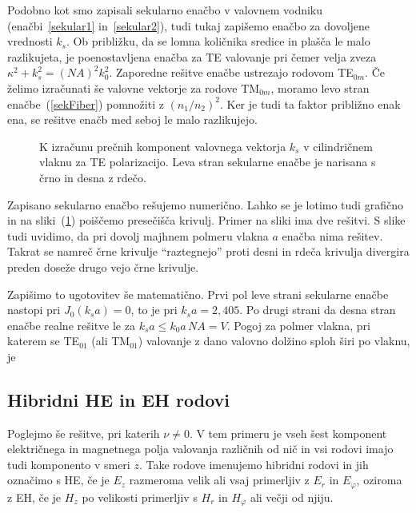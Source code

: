 Podobno kot smo zapisali sekularno enačbo v valovnem vodniku (enačbi~\ref{sekular1}
in~\ref{sekular2}), tudi tukaj zapišemo enačbo za dovoljene vrednosti $k_s$. 
Ob približku, da se lomna količnika
sredice in plašča le malo razlikujeta, je poenostavljena enačba za TE valovanje
pri čemer velja zveza $\kappa^2+k_s^2=(NA)^2k_0^2$. Zaporedne rešitve enačbe ustrezajo rodovom TE$_{0m}$. 
Če želimo izračunati še valovne vektorje za rodove TM$_{0m}$, moramo levo stran enačbe~(\ref{sekFiber}) pomnožiti
z $(n_1/n_2)^2$. Ker je tudi ta faktor približno enak ena, se rešitve enačb med seboj le malo razlikujejo.
\begin{figure}[h]
\centering
\def\svgwidth{90truemm} 

\caption{K izračunu prečnih komponent valovnega vektorja $k_s$ v 
cilindričnem vlaknu za TE polarizacijo.
Leva stran sekularne enačbe je narisana s črno in desna z rdečo.}
\label{fig:TEsecFib}
\end{figure} 

Zapisano sekularno enačbo rešujemo numerično. Lahko se je lotimo tudi grafično in 
na sliki~(\ref{fig:TEsecFib}) poiščemo presečišča krivulj. Primer na sliki 
ima dve rešitvi. S slike tudi uvidimo, da pri dovolj majhnem polmeru 
vlakna $a$ enačba nima rešitev. Takrat se namreč
črne krivulje ``raztegnejo'' proti desni in rdeča krivulja divergira preden 
doseže drugo vejo črne krivulje.

Zapišimo to ugotovitev še matematično. Prvi pol leve strani sekularne enačbe nastopi pri 
$J_0 (k_s a)  = 0$, to je pri $k_s a= 2,405$. 
Po drugi strani da desna stran enačbe realne rešitve le za $k_s a \le k_0 a\,NA = V$.
Pogoj za polmer vlakna, pri katerem se TE$_{01}$ (ali TM$_{01}$) 
valovanje z dano valovno dolžino sploh širi po vlaknu, je 

\subsection*{Hibridni HE in EH rodovi}
Poglejmo še rešitve, pri katerih $\nu \neq 0$. V tem primeru je 
vseh šest komponent električnega in magnetnega polja valovanja različnih od nič in vsi rodovi
imajo tudi komponento v smeri $z$. Take rodove imenujemo hibridni rodovi in jih 
označimo s HE, če je $E_z$ razmeroma velik ali vsaj primerljiv z $E_r$ in $E_\varphi$, 
oziroma z EH, če je $H_z$ po velikosti primerljiv s $H_r$ in $H_\varphi$ ali večji od njiju. 

